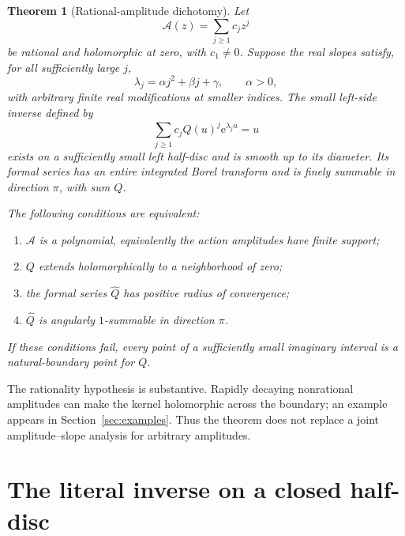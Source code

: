 \documentclass[11pt,a4paper]{article}
\numberwithin{equation}{section}
\newtheorem{theorem}{Theorem}[section]
\theoremstyle{definition}
\theoremstyle{remark}
\newcommand{\ee}{\mathrm e}
\newcommand{\Q}{\widehat Q}
\newcommand{\rationalamp}{\mathcal A}
\begin{document}
\begin{theorem}[Rational-amplitude dichotomy]
\label{thm:rational-main}
Let
\begin{equation}
 \rationalamp(z)=\sum_{j\ge1}c_jz^j
 \label{eq:amplitudes}
\end{equation}
be rational and holomorphic at zero, with $c_1\ne0$.  Suppose the real
slopes satisfy, for all sufficiently large $j$,
\begin{equation}
 \lambda_j=\alpha j^2+\beta j+\gamma,
 \qquad \alpha>0,
 \label{eq:eventual-quadratic}
\end{equation}
with arbitrary finite real modifications at smaller indices.  The small
left-side inverse defined by
\begin{equation}
 \sum_{j\ge1}c_jQ(u)^j\ee^{\lambda_j u}=u
 \label{eq:weighted-kernel}
\end{equation}
exists on a sufficiently small left half-disc and is smooth up to its
diameter.  Its formal series has an entire integrated Borel transform and
is finely summable in direction $\pi$, with sum $Q$.

The following conditions are equivalent:
\begin{enumerate}[label=\textup{(\alph*)}]
\item $\rationalamp$ is a polynomial, equivalently the action amplitudes
have finite support;
\item $Q$ extends holomorphically to a neighborhood of zero;
\item the formal series $\Q$ has positive radius of convergence;
\item $\Q$ is angularly $1$-summable in direction $\pi$.
\end{enumerate}
If these conditions fail, every point of a sufficiently small imaginary
interval is a natural-boundary point for $Q$.
\end{theorem}

The rationality hypothesis is substantive.  Rapidly decaying nonrational
amplitudes can make the kernel holomorphic across the boundary; an example
appears in Section~\ref{sec:examples}.  Thus the theorem does not replace a
joint amplitude--slope analysis for arbitrary amplitudes.

\section{The literal inverse on a closed half-disc}
\label{sec:inverse}
\end{document}
